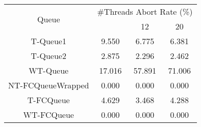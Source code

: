 \begin{tabular}{|c|c|c|c|}
\hline
\multirow{2}{*}{Queue} & \multicolumn{3}{c|}{\#Threads Abort Rate (\%)}\\\cline{2-4}& \quad 4 & 12 & 20\\
\hline
\hline
T-Queue1 & 9.550 & 6.775 & 6.381\\
T-Queue2 & 2.875 & 2.296 & 2.462\\
WT-Queue & 17.016 & 57.891 & 71.006\\
NT-FCQueueWrapped & 0.000 & 0.000 & 0.000\\
T-FCQueue & 4.629 & 3.468 & 4.288\\
WT-FCQueue & 0.000 & 0.000 & 0.000\\
\hline\end{tabular}
